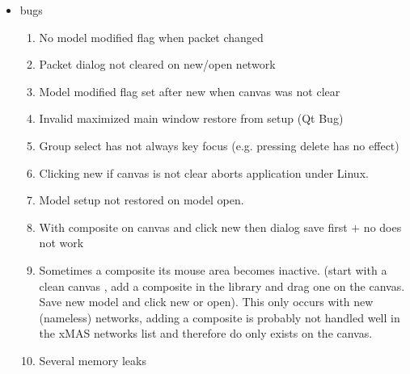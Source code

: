 \begin{itemize}
\item	bugs
\begin{enumerate}
\item	No model modified flag when packet changed
\item	Packet dialog not cleared on new/open network
\item	Model modified flag set after new when canvas was not clear
\item	Invalid maximized main window restore from setup (Qt Bug)
\item	Group select has not always key focus (e.g. pressing delete has no effect)
\item	Clicking new if canvas is not clear aborts application under Linux.
\item	Model setup not restored on model open.
\item With composite on canvas and click new then dialog save first $+$ no does not
work
\item Sometimes a composite its mouse area becomes inactive. (start with a clean
canvas , add a composite in the library and drag one on the canvas. Save new
model and click new or open). This only occurs with new (nameless) networks,
adding a composite is probably not handled well in the xMAS networks list and
therefore do only exists on the canvas.
\item	Several memory leaks
\end{enumerate}


\end{itemize}
